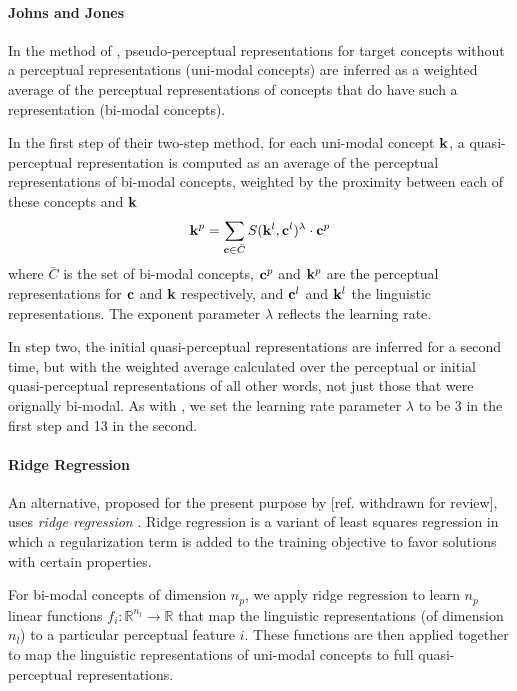 \paragraph{Johns and Jones}In the method of \cite{johns2012perceptual}, pseudo-perceptual representations for target concepts without a perceptual representations (uni-modal concepts) are inferred as a weighted average of the perceptual representations of concepts that do have such a representation (bi-modal concepts). 

In the first step of their two-step method, for each uni-modal concept  \(\bf k\), a quasi-perceptual representation is computed as an average of the perceptual representations of bi-modal concepts, weighted by the proximity between each of these concepts and \( \bf k\)\[{\bf k}^p = \sum_{{\bf c} \in \bar{C}} S({\bf k}^l,{\bf c}^l)^\lambda \cdot {\bf c}^p  \] where \(  \bar{C} \) is the set of bi-modal concepts, \({\bf c}^p\) and  \({\bf k}^p\) are the perceptual representations for \(\bf c\) and \(\bf k\) respectively, and  \({\bf c}^l\) and \({\bf k}^l\) the linguistic representations. The exponent parameter \(\lambda \) reflects the learning rate. 

In step two, the initial quasi-perceptual representations are inferred for a second time, but with the weighted average calculated over the perceptual or initial quasi-perceptual representations of all other words, not just those that were orignally bi-modal. As with \cite{johns2012perceptual}, we set the learning rate parameter \( \lambda\) to be 3 in the first step and 13 in the second.  


\paragraph{Ridge Regression}An alternative, proposed for the present purpose by [ref. withdrawn for review], uses \emph{ridge regression} \cite{myers1990classical}. Ridge regression is a variant of least squares regression in which a regularization term is added to the training objective to favor solutions with certain properties. 

For bi-modal concepts of dimension \(n_p\), we apply ridge regression to learn \(n_p\) linear functions \( f_i: \mathbb{R}^{n_l} \to \mathbb{R} \) that map the linguistic representations (of dimension \(n_l\)) to a particular perceptual feature \(i\). These functions are then applied together to map the linguistic representations of uni-modal concepts to full quasi-perceptual representations.


